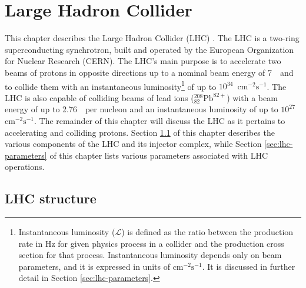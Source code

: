 \section{Large Hadron Collider}
\label{ch:lhc}

This chapter describes the Large Hadron Collider 
(LHC) \cite{lhc-jinst}.
The LHC is a two-ring superconducting synchrotron, built and operated by the 
European Organization for Nuclear Research
(CERN).
The LHC's main purpose is to accelerate two beams of protons in opposite directions
up to a nominal beam energy of 7~\TeV~and to collide them with an instantaneous 
luminosity\footnote{Instantaneous luminosity ($\mathcal{L}$) is defined  as the ratio
between the production rate in Hz for given physics process in a collider and the 
production cross section for that process.  Instantaneous luminosity depends only on beam parameters,
and it is expressed in units of $\text{cm}^{-2}\text{s}^{-1}$.  It is discussed in further detail
in Section \ref{sec:lhc-parameters}.  }
of up to $10^{34}$~$\text{cm}^{-2}\text{s}^{-1}$.
The LHC is also capable of colliding beams of lead ions ($^{208}_{82}\text{Pb}^{82+}$)
with a beam energy of up to 2.76~\TeV~per nucleon and an instantaneous luminosity
of up to $10^{27}$~$\text{cm}^{-2}\text{s}^{-1}$.  The remainder of this
chapter will discuss the LHC as it pertains to accelerating and colliding protons.
Section \ref{sec:lhc-structure} of this chapter describes the various components of the LHC 
and its injector complex, while Section \ref{sec:lhc-parameters} of this chapter
lists various parameters associated with LHC operations.

\subsection{LHC structure}
\label{sec:lhc-structure}


